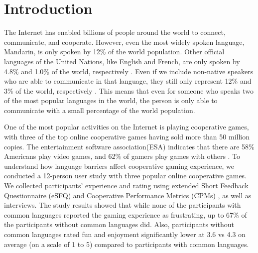 \section{Introduction}

The Internet has enabled billions of people around the world to connect, communicate, and cooperate. However, even the most widely spoken language, Mandarin, is only spoken by 12\% of the world population. 
Other official languages of the United Nations, like English and French, are only spoken by 4.8\% and 1.0\% of the world, respectively \cite{I1}. 
Even if we include non-native speakers who are able to communicate in that language, they still only represent 12\% and 3\% of the world, respectively \cite{I2,I3}. This means that even for someone who speaks two of the most popular languages in the world, the person is only able to communicate with a small percentage of the world population.

One of the most popular activities on the Internet is playing cooperative games, with three of the top online cooperative games having sold more than 50 million copies. The entertainment software association(ESA) indicates that there are 58\% Americans play video games, and 62\% of gamers play games with others \cite{I4}. To understand how language barriers affect cooperative gaming experience, we conducted a 12-person user study with three popular online cooperative games. We collected participants' experience and rating using extended Short Feedback Questionnaire (eSFQ) \cite{eSFQ} and Cooperative Performance Metrics (CPMs) \cite{CPMs}, as well as interviews. The study results showed that while none of the participants with common languages reported the gaming experience as frustrating, up to 67\% of the participants without common languages did. Also, participants without common languages rated fun and enjoyment significantly lower at 3.6 vs 4.3 on average (on a scale of 1 to 5) compared to participants with common languages. 

%
%

